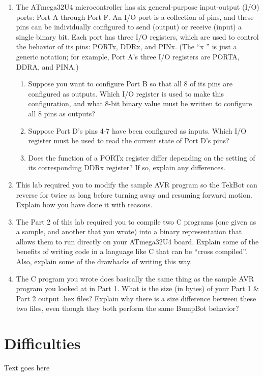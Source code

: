 \documentclass[12pt,letterpaper]{article}
\begin{document}
\begin{enumerate}
\begin{enumerate}
	\end{enumerate}
	\item 
	The ATmega32U4 microcontroller has six general-purpose input-output (I/O) ports: Port A through Port F. An I/O port is a collection of pins, and these pins can be individually configured to send (output) or receive (input) a single binary bit. Each port has three I/O registers, which are used to control the behavior of its pins: PORTx, DDRx, and PINx. (The
	“x ” is just a generic notation; for example, Port A’s three I/O registers are PORTA, DDRA, and PINA.)
	\begin{enumerate}
		\item 
		Suppose you want to configure Port B so that all 8 of its pins are configured as outputs. Which I/O register is used to make this configuration, and what 8-bit binary value must be written to configure all 8 pins as outputs?
		\item 
		Suppose Port D’s pins 4-7 have been configured as inputs. Which I/O register must be used to read the current state of Port D’s pins?
		\item 
		Does the function of a PORTx register differ depending on the setting of its corresponding DDRx register? If so, explain any differences.
	\end{enumerate}


    \item
	This lab required you to modify the sample AVR program so the TekBot can reverse for twice as long before turning away and resuming forward motion. Explain how you have done it with reasons.
	
	\item 
	The Part 2 of this lab required you to compile two C programs (one given as a sample, and another that you wrote) into a binary representation that allows them to run directly on your ATmega32U4 board. Explain some of the benefits of writing code in a language like C that can be “cross compiled”. Also, explain some of the drawbacks of writing this way.
	
	\item 
	The C program you wrote does basically the same thing as the sample AVR	program you looked at in Part 1. What is the size (in bytes) of your Part 1 \& Part 2 output .hex files? Explain why there is a size difference between these two files, even though they both perform the same BumpBot behavior?

\end{enumerate}

\section{Difficulties}
Text goes here
\end{document}
